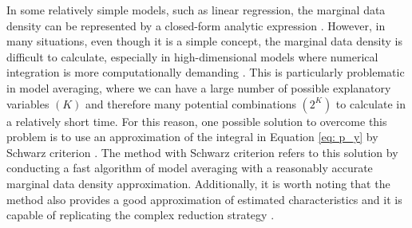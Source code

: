 In some relatively simple models, such as linear regression, the marginal
data density can be represented by a closed-form analytic
expression \citep[][]{zellner1971, fernandezleysteel2001b, koop2003}.
However, in many situations, even though it is a simple concept,
the marginal data density is difficult to calculate, especially
in high-dimensional models where numerical integration is more
computationally demanding
\citep[see][]{Newton_Raftery_1994, gelman2013bayesian, Pajor2017}.
This is particularly problematic in model averaging, where we
can have a large number of possible explanatory variables $(K)$
and therefore many potential combinations $(2^K)$ to calculate
in a relatively short time. For this reason, one possible
solution to overcome this problem is to use an approximation
of the integral in Equation \ref{eq: p_y} by Schwarz criterion
\citep{Schwarz_1978}. The  method with Schwarz
criterion refers to this solution by conducting a fast algorithm
of model averaging with a reasonably accurate marginal data
density approximation. Additionally, it is worth noting that
the  method also provides a good approximation of
estimated characteristics  and it is capable of replicating
the complex reduction strategy \citep{Kufel_jae_2020}.

